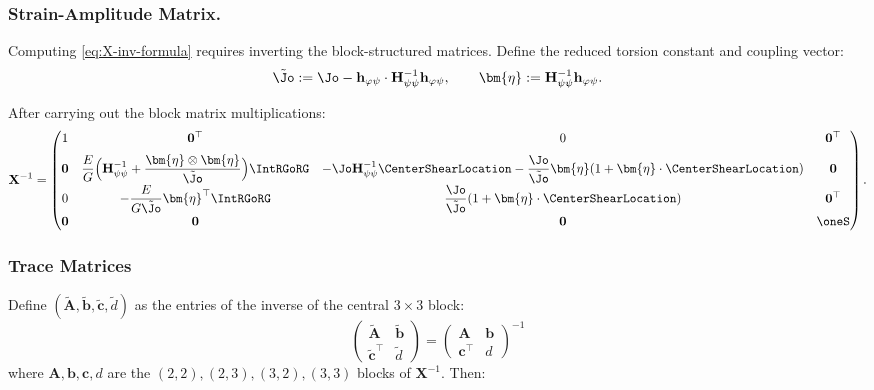 \subsubsection{Strain-Amplitude Matrix.}

Computing \eqref{eq:X-inv-formula} requires inverting the block-structured 
matrices. Define the reduced torsion constant and coupling vector:
\begin{equation}
\tilde{\Jo} := \Jo - \mathbf{h}_{\varphi\psi}\cdot \mathbf{H}_{\psi\psi}^{-1} \mathbf{h}_{\varphi\psi}, 
\qquad 
\bm{\eta} := \mathbf{H}_{\psi\psi}^{-1} \mathbf{h}_{\varphi\psi}.
\label{eq:reduced-torsion}
\end{equation}

After carrying out the block matrix multiplications:
\begin{equation}
\mathbf{X}^{-1} = \begin{pmatrix}
1 & \mathbf{0}^\top & 0 & \mathbf{0}^\top \\[6pt]
\mathbf{0} & \displaystyle\frac{E}{G}\Big(\mathbf{H}_{\psi\psi}^{-1} 
+ \frac{\bm{\eta}\otimes\bm{\eta}}{\tilde{\Jo}}\Big)\IntRGoRG 
& -\Jo\mathbf{H}_{\psi\psi}^{-1}\CenterShearLocation 
- \displaystyle\frac{\Jo}{\tilde{\Jo}}\bm{\eta}(1 + \bm{\eta}\cdot\CenterShearLocation) 
& \mathbf{0} \\[6pt]
0 & -\displaystyle\frac{E}{G\tilde{\Jo}}\bm{\eta}^\top\IntRGoRG 
& \displaystyle\frac{\Jo}{\tilde{\Jo}}(1 + \bm{\eta}\cdot\CenterShearLocation) 
& \mathbf{0}^\top \\[6pt]
\mathbf{0} & \mathbf{0} & \mathbf{0} & \oneS
\end{pmatrix}.
\label{eq:X-inv-explicit}
\end{equation}


\subsubsection{Trace Matrices}

Define $(\tilde{\mathbf{A}}, \tilde{\mathbf{b}}, \tilde{\mathbf{c}}, \tilde{d})$ as the entries of the inverse of the central $3 \times 3$ block:
$$
\begin{pmatrix} \tilde{\mathbf{A}} & \tilde{\mathbf{b}} \\ \tilde{\mathbf{c}}^\top & \tilde{d} \end{pmatrix} = \begin{pmatrix} \mathbf{A} & \mathbf{b} \\ \mathbf{c}^\top & d \end{pmatrix}^{-1}
$$
where $\mathbf{A}, \mathbf{b}, \mathbf{c}, d$ are the $(2,2), (2,3), (3,2), (3,3)$ blocks of $\mathbf{X}^{-1}$. 
Then:


